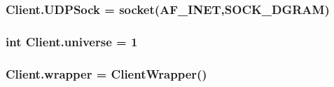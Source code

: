 \subsubsection[{\texorpdfstring{U\+D\+P\+Sock}{UDPSock}}]{\setlength{\rightskip}{0pt plus 5cm}Client.\+U\+D\+P\+Sock = socket(A\+F\+\_\+\+I\+N\+ET,S\+O\+C\+K\+\_\+\+D\+G\+R\+AM)}\hypertarget{namespaceClient_a34f31635b731e58b9d00def9e7bc358f}{}\label{namespaceClient_a34f31635b731e58b9d00def9e7bc358f}
\subsubsection[{\texorpdfstring{universe}{universe}}]{\setlength{\rightskip}{0pt plus 5cm}int Client.\+universe = 1}\hypertarget{namespaceClient_ac4cedbaff7abc4792f7c896b6198e527}{}\label{namespaceClient_ac4cedbaff7abc4792f7c896b6198e527}
\subsubsection[{\texorpdfstring{wrapper}{wrapper}}]{\setlength{\rightskip}{0pt plus 5cm}Client.\+wrapper = Client\+Wrapper()}\hypertarget{namespaceClient_a4434f1a86cf88cad290038ad5225aa8a}{}\label{namespaceClient_a4434f1a86cf88cad290038ad5225aa8a}
